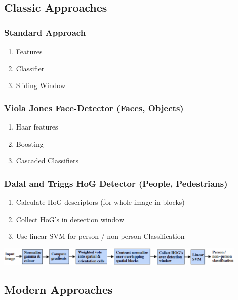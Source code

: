 \subsection{Classic Approaches}
\begin{multicols}{2}
    \subsubsection{Standard Approach}
    \begin{enumerate}
        \item Features
        \item Classifier
        \item Sliding Window
    \end{enumerate}

    \subsubsection{Viola Jones Face-Detector (Faces, Objects)}
    \begin{enumerate}
        \item Haar features
        \item Boosting
        \item Cascaded Classifiers
    \end{enumerate}
\end{multicols}

\subsubsection{Dalal and Triggs HoG Detector (People, Pedestrians)}
\begin{enumerate}
    \item Calculate HoG descriptors (for whole image in blocks)
    \item Collect HoG's in detection window
    \item Use linear SVM for person / non-person Classification
\end{enumerate}
\includegraphics[width=0.9\textwidth]{sections/FindingMultipleObjects/img/dalal_triggs.png}

\subsection{Modern Approaches}
